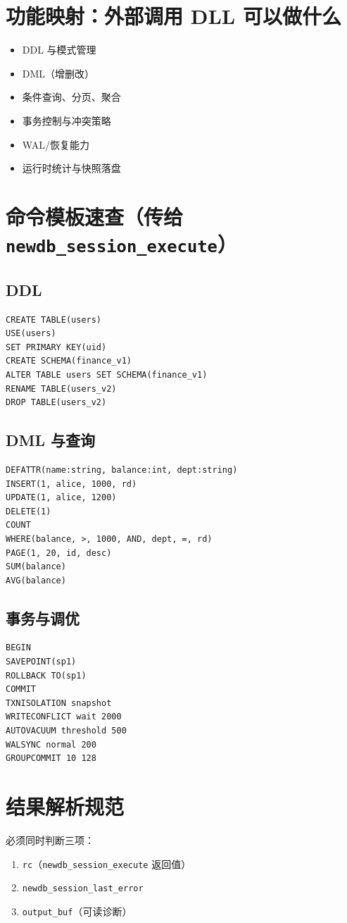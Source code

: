 \documentclass[11pt,a4paper]{ctexart}
\begin{document}
\section{功能映射：外部调用 DLL 可以做什么}
\begin{itemize}
  \item DDL 与模式管理
  \item DML（增删改）
  \item 条件查询、分页、聚合
  \item 事务控制与冲突策略
  \item WAL/恢复能力
  \item 运行时统计与快照落盘
\end{itemize}

\section{命令模板速查（传给 \texttt{newdb\_session\_execute}）}
\subsection{DDL}
\begin{lstlisting}
CREATE TABLE(users)
USE(users)
SET PRIMARY KEY(uid)
CREATE SCHEMA(finance_v1)
ALTER TABLE users SET SCHEMA(finance_v1)
RENAME TABLE(users_v2)
DROP TABLE(users_v2)
\end{lstlisting}

\subsection{DML 与查询}
\begin{lstlisting}
DEFATTR(name:string, balance:int, dept:string)
INSERT(1, alice, 1000, rd)
UPDATE(1, alice, 1200)
DELETE(1)
COUNT
WHERE(balance, >, 1000, AND, dept, =, rd)
PAGE(1, 20, id, desc)
SUM(balance)
AVG(balance)
\end{lstlisting}

\subsection{事务与调优}
\begin{lstlisting}
BEGIN
SAVEPOINT(sp1)
ROLLBACK TO(sp1)
COMMIT
TXNISOLATION snapshot
WRITECONFLICT wait 2000
AUTOVACUUM threshold 500
WALSYNC normal 200
GROUPCOMMIT 10 128
\end{lstlisting}

\section{结果解析规范}
必须同时判断三项：
\begin{enumerate}
  \item \texttt{rc}（\texttt{newdb\_session\_execute} 返回值）
  \item \texttt{newdb\_session\_last\_error}
  \item \texttt{output\_buf}（可读诊断）
\end{enumerate}
\end{document}
